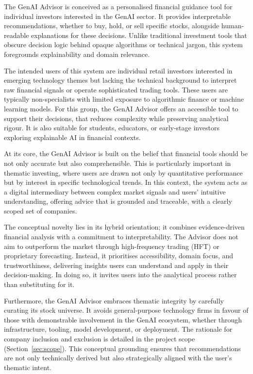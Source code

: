The GenAI Advisor is conceived as a personalised financial guidance tool for individual investors interested in the GenAI sector. It provides interpretable recommendations, whether to buy, hold, or sell specific stocks, alongside human-readable explanations for these decisions. Unlike traditional investment tools that obscure decision logic behind opaque algorithms or technical jargon, this system foregrounds explainability and domain relevance.

The intended users of this system are individual retail investors interested in emerging technology themes but lacking the technical background to interpret raw financial signals or operate sophisticated trading tools. These users are typically non-specialists with limited exposure to algorithmic finance or machine learning models. For this group, the GenAI Advisor offers an accessible tool to support their decisions, that reduces complexity while preserving analytical rigour. It is also suitable for students, educators, or early-stage investors exploring explainable AI in financial contexts.

At its core, the GenAI Advisor is built on the belief that financial tools should be not only accurate but also comprehensible. This is particularly important in thematic investing, where users are drawn not only by quantitative performance but by interest in specific technological trends. In this context, the system acts as a digital intermediary between complex market signals and users' intuitive understanding, offering advice that is grounded and traceable, with a clearly scoped set of companies.

The conceptual novelty lies in its hybrid orientation; it combines evidence-driven financial analysis with a commitment to interpretability. The Advisor does not aim to outperform the market through high-frequency trading (HFT) or proprietary forecasting. Instead, it prioritises accessibility, domain focus, and trustworthiness, delivering insights users can understand and apply in their decision-making. In doing so, it invites users into the analytical process rather than substituting for it.

Furthermore, the GenAI Advisor embraces thematic integrity by carefully curating its stock universe. It avoids general-purpose technology firms in favour of those with demonstrable involvement in the GenAI ecosystem, whether through infrastructure, tooling, model development, or deployment. The rationale for company inclusion and exclusion is detailed in the project scope (Section~\ref{sec:scope}). This conceptual grounding ensures that recommendations are not only technically derived but also strategically aligned with the user's thematic intent.

